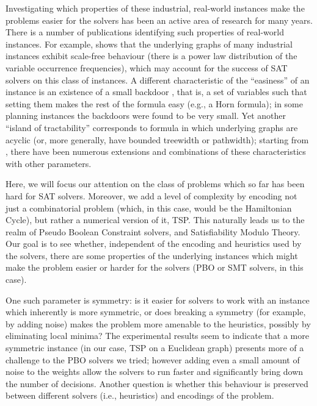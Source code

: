 \documentclass{llncs}
\begin{document}
Investigating which properties of these industrial, real-world instances make the problems easier for the solvers has been an active area of research for many years.  There is a number of publications identifying such properties of real-world instances.  For example, \cite{ABL09} shows that the underlying graphs of many industrial instances exhibit   scale-free behaviour (there is a power law distribution of the variable occurrence frequencies), which may account for the success of SAT solvers on this class of instances. A different characteristic of the ``easiness'' of an instance is an existence of a small backdoor \cite{WGS03}, that is, a set of variables such that setting them makes the rest of the formula easy (e.g., a Horn formula); in some planning instances the backdoors were found to be very small. Yet another ``island of tractability'' corresponds to formula in which underlying graphs are acyclic (or, more generally, have bounded treewidth or pathwidth); starting from \cite{Fre85,DP89}, there have been numerous extensions and combinations of these characteristics with other parameters. 

Here, we will focus our attention on the class of problems which so far has been hard for SAT solvers. Moreover, we add a level of complexity by encoding not just a combinatorial   problem (which, in this case, would be the Hamiltonian Cycle), but rather a numerical version of it, TSP.  This naturally leads us to the realm of Pseudo Boolean Constraint solvers, and Satisfiability Modulo Theory. Our goal is to see whether, independent of the encoding and heuristics used by the solvers, there are some properties of the underlying instances  which might make the problem easier or harder for the solvers (PBO or SMT solvers, in this case).  

One such parameter is symmetry: is it easier for solvers to work with an instance which inherently is more symmetric, or does breaking a symmetry (for example, by adding noise) makes the problem more amenable to the heuristics, possibly by eliminating local minima?   The experimental results seem to indicate that a more symmetric instance (in our case, TSP on a Euclidean graph) presents more of a challenge to the PBO solvers we tried; however adding even a small amount of noise to the weights allow the solvers to run faster and significantly bring down the number of decisions. Another question is whether this behaviour is preserved between different solvers (i.e., heuristics) and encodings  of the problem. 
\end{document}
